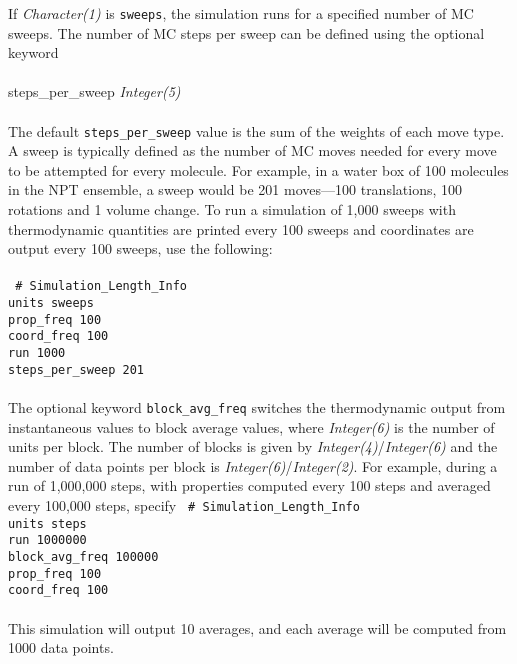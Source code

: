 %
If {\it Character(1)} is {\tt sweeps}, the simulation runs for a specified number of MC sweeps.
The number of MC steps per sweep can be defined using the optional keyword \\ \\
%
steps\_per\_sweep {\it Integer(5)} \\ \\
%
The default \texttt{steps\_per\_sweep} value is the sum of the weights of each move type.
A sweep is typically defined as the number of MC moves needed for every move to be attempted for every molecule.
For example, in a water box of 100 molecules in the NPT ensemble, a sweep would be 201 moves---100 translations,
100 rotations and 1 volume change.
To run a simulation of 1,000 sweeps with thermodynamic quantities are printed every 100 sweeps
and coordinates are output every 100 sweeps, use the following: \\ \\
%
\texttt{
\# Simulation\_Length\_Info \\
units             sweeps \\
prop\_freq        100 \\
coord\_freq       100 \\
run               1000 \\
steps\_per\_sweep 201 \\} \\
%
The optional keyword {\tt block\_avg\_freq} switches the thermodynamic output from instantaneous values
to block average values, where {\it Integer(6)} is the number of units per block.
The number of blocks is given by {\it Integer(4)}/{\it Integer(6)}
and the number of data points per block is {\it Integer(6)}/{\it Integer(2)}.
For example, during a run of 1,000,000 steps, with properties computed every 100 steps and
averaged every 100,000 steps, specify
%
\texttt{
\# Simulation\_Length\_Info \\
units             steps \\
run               1000000 \\
block\_avg\_freq  100000 \\
prop\_freq        100 \\
coord\_freq       100 \\} \\
%
This simulation will output 10 averages, and each average will be computed from 1000 data points.
%
%
%
